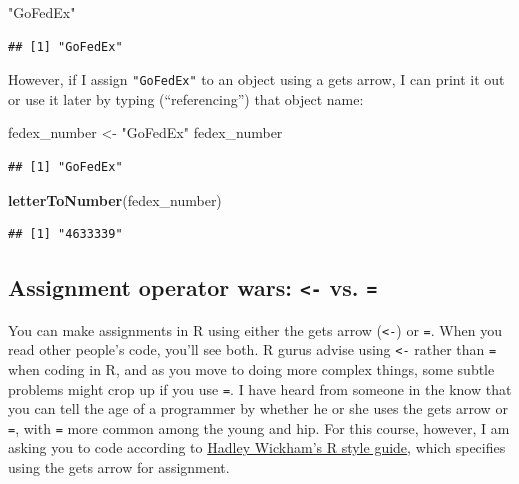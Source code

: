 \documentclass[]{book}
\makeatletter
\newenvironment{Shaded}{\begin{snugshade}}{\end{snugshade}}
\newcommand{\KeywordTok}[1]{\textcolor[rgb]{0.13,0.29,0.53}{\textbf{#1}}}
\newcommand{\StringTok}[1]{\textcolor[rgb]{0.31,0.60,0.02}{#1}}
\newcommand{\NormalTok}[1]{#1}
\newenvironment{kframe}{%
\medskip{}
\setlength{\fboxsep}{.8em}
 \def\at@end@of@kframe{}%
 \ifinner\ifhmode%
  \def\at@end@of@kframe{\end{minipage}}%
  \begin{minipage}{\columnwidth}%
 \fi\fi%
 \def\FrameCommand##1{\hskip\@totalleftmargin \hskip-\fboxsep
 \colorbox{shadecolor}{##1}\hskip-\fboxsep
     \hskip-\linewidth \hskip-\@totalleftmargin \hskip\columnwidth}%
 \MakeFramed {\advance\hsize-\width
   \@totalleftmargin\z@ \linewidth\hsize
   \@setminipage}}%
 {\par\unskip\endMakeFramed%
 \at@end@of@kframe}
\renewenvironment{Shaded}{\begin{kframe}}{\end{kframe}}
\theoremstyle{definition}
\theoremstyle{definition}
\theoremstyle{definition}
\theoremstyle{remark}
\makeatother
\begin{document}
\begin{Shaded}
\begin{Highlighting}[]
\StringTok{"GoFedEx"}
\end{Highlighting}
\end{Shaded}

\begin{verbatim}
## [1] "GoFedEx"
\end{verbatim}

However, if I assign \texttt{"GoFedEx"} to an object using a gets arrow,
I can print it out or use it later by typing (``referencing'') that
object name:

\begin{Shaded}
\begin{Highlighting}[]
\NormalTok{fedex_number <-}\StringTok{ "GoFedEx"}
\NormalTok{fedex_number}
\end{Highlighting}
\end{Shaded}

\begin{verbatim}
## [1] "GoFedEx"
\end{verbatim}

\begin{Shaded}
\begin{Highlighting}[]
\KeywordTok{letterToNumber}\NormalTok{(fedex_number)}
\end{Highlighting}
\end{Shaded}

\begin{verbatim}
## [1] "4633339"
\end{verbatim}

\subsection{\texorpdfstring{Assignment operator wars:
\texttt{\textless{}-} vs.
\texttt{=}}{Assignment operator wars: \textless{}- vs. =}}\label{assignment-operator-wars---vs.}

You can make assignments in R using either the gets arrow
(\texttt{\textless{}-}) or \texttt{=}. When you read other people's
code, you'll see both. R gurus advise using \texttt{\textless{}-} rather
than \texttt{=} when coding in R, and as you move to doing more complex
things, some subtle problems might crop up if you use \texttt{=}. I have
heard from someone in the know that you can tell the age of a programmer
by whether he or she uses the gets arrow or \texttt{=}, with \texttt{=}
more common among the young and hip. For this course, however, I am
asking you to code according to
\href{http://adv-r.had.co.nz/Style.html}{Hadley Wickham's R style
guide}, which specifies using the gets arrow for assignment.
\end{document}
